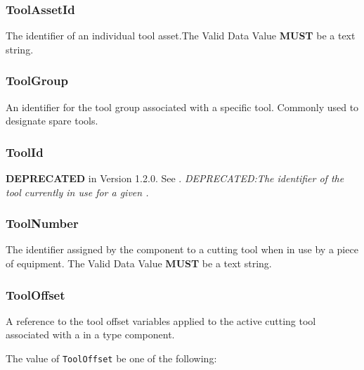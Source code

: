 \FloatBarrier

\subsubsection{ToolAssetId}
\label{sec:ToolAssetId}



The identifier of an individual tool asset.The \gls{Valid Data Value} \textbf{MUST} be a text string.


\subsubsection{ToolGroup}
\label{sec:ToolGroup}



An identifier for the tool group associated with a specific tool. Commonly used to designate spare tools.


\subsubsection{ToolId}
\label{sec:ToolId}



\textbf{DEPRECATED} in Version 1.2.0.   See . \textit{DEPRECATED:The identifier of the tool currently in use for a given .}


\subsubsection{ToolNumber}
\label{sec:ToolNumber}



The identifier assigned by the  component to a cutting tool when in use by a piece of equipment. 
 The \gls{Valid Data Value} \textbf{MUST} be a text string.


\subsubsection{ToolOffset}
\label{sec:ToolOffset}



A reference to the tool offset variables applied to the active cutting tool associated with a  in a  type component.


The value of \texttt{ToolOffset} \MUST be one of the following: 

\FloatBarrier


